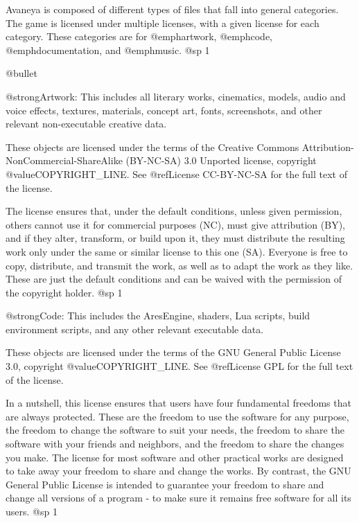 
Avaneya is composed of different types of files that fall into general categories. The game is licensed under multiple licenses, with a given license for each category. These categories are for @emph{artwork}, @emph{code}, @emph{documentation}, and @emph{music}.
@sp 1

\itemize @bullet
\item
@strong{Artwork:} This includes all literary works, cinematics, models, audio and voice effects, textures, materials, concept art, fonts, screenshots, and other relevant non-executable creative data. 

These objects are licensed under the terms of the Creative Commons Attribution-NonCommercial-ShareAlike (BY-NC-SA) 3.0 Unported license, copyright @value{COPYRIGHT_LINE}. See @ref{License CC-BY-NC-SA} for the full text of the license.

The license ensures that, under the default conditions, unless given permission, others cannot use it for commercial purposes (NC), must give attribution (BY), and if they alter, transform, or build upon it, they must distribute the resulting work only under the same or similar license to this one (SA). Everyone is free to copy, distribute, and transmit the work, as well as to adapt the work as they like. These are just the default conditions and can be waived with the permission of the copyright holder.
@sp 1

\item
@strong{Code:} This includes the AresEngine, shaders, Lua scripts, build environment scripts, and any other relevant executable data.

These objects are licensed under the terms of the GNU General Public License 3.0, copyright @value{COPYRIGHT_LINE}. See @ref{License GPL} for the full text of the license.

In a nutshell, this license ensures that users have four fundamental freedoms that are always protected. These are the freedom to use the software for any purpose, the freedom to change the software to suit your needs, the freedom to share the software with your friends and neighbors, and the freedom to share the changes you make. The license for most software and other practical works are designed to take away your freedom to share and change the works. By contrast, the GNU General Public License is intended to guarantee your freedom to share and change all versions of a program - to make sure it remains free software for all its users.
@sp 1

